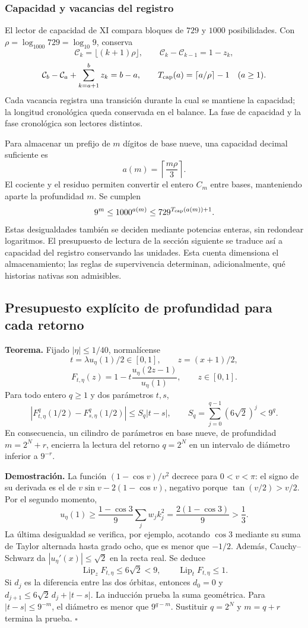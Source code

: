 \subsubsection{Capacidad y vacancias del registro}

El lector de capacidad de XI compara bloques de \(729\) y \(1000\) posibilidades. Con \(\rho=\log_{1000}729=\log_{10}9\), conserva
\[
\mathcal C_k=\lfloor(k+1)\rho\rfloor,\qquad
\mathcal C_k-\mathcal C_{k-1}=1-z_k,
\]
\[
\mathcal C_b-\mathcal C_a+\sum_{k=a+1}^b z_k=b-a,
\qquad T_{\rm cap}(a)=\lceil a/\rho\rceil-1\quad(a\ge1).
\]
Cada vacancia registra una transición durante la cual se mantiene la capacidad; la longitud cronológica queda conservada en el balance. La fase de capacidad y la fase cronológica son lectores distintos.

Para almacenar un prefijo de \(m\) dígitos de base nueve, una capacidad decimal suficiente es
\[
a(m)=\left\lceil\frac{m\rho}{3}\right\rceil.
\]
El cociente y el residuo permiten convertir el entero \(C_m\) entre bases, manteniendo aparte la profundidad \(m\). Se cumplen
\[
9^m\le1000^{a(m)}\le729^{T_{\rm cap}(a(m))+1}.
\]
Estas desigualdades también se deciden mediante potencias enteras, sin redondear logaritmos. El presupuesto de lectura de la sección siguiente se traduce así a capacidad del registro conservando las unidades. Esta cuenta dimensiona el almacenamiento; las reglas de supervivencia determinan, adicionalmente, qué historias nativas son admisibles.


\subsection{Presupuesto explícito de profundidad para cada retorno}
\label{hmtfg:prolongacion:3}

\textbf{Teorema.} Fijado \(|\eta|\le1/40\), normalícense
\[
t=\lambda u_\eta(1)/2\in[0,1],\qquad z=(x+1)/2,
\]
\[
F_{t,\eta}(z)=1-t\frac{u_\eta(2z-1)}{u_\eta(1)},\qquad z\in[0,1].
\]
Para todo entero \(q\ge1\) y dos parámetros \(t,s\),
\[
\left|F_{t,\eta}^{q}(1/2)-F_{s,\eta}^{q}(1/2)\right|
\le S_q|t-s|,
\qquad S_q=\sum_{j=0}^{q-1}(6\sqrt2)^j<9^q.
\]
En consecuencia, un cilindro de parámetros en base nueve, de profundidad \(m=2^N+r\), encierra la lectura del retorno \(q=2^N\) en un intervalo de diámetro inferior a \(9^{-r}\).

\textbf{Demostración.} La función \((1-\cos v)/v^2\) decrece para \(0<v<\pi\): el signo de su derivada es el de \(v\sin v-2(1-\cos v)\), negativo porque \(\tan(v/2)>v/2\). Por el segundo momento,
\[
u_\eta(1)\ge\frac{1-\cos3}{9}\sum_jw_jk_j^2
=\frac{2(1-\cos3)}9>\frac13.
\]
La última desigualdad se verifica, por ejemplo, acotando \(\cos3\) mediante su suma de Taylor alternada hasta grado ocho, que es menor que \(-1/2\). Además, Cauchy–Schwarz da \(|u_\eta'(x)|\le\sqrt2\) en la recta real. Se deduce
\[
\operatorname{Lip}_zF_{t,\eta}\le6\sqrt2<9,\qquad
\operatorname{Lip}_tF_{t,\eta}\le1.
\]
Si \(d_j\) es la diferencia entre las dos órbitas, entonces \(d_0=0\) y \(d_{j+1}\le6\sqrt2\,d_j+|t-s|\). La inducción prueba la suma geométrica. Para \(|t-s|\le9^{-m}\), el diámetro es menor que \(9^{q-m}\). Sustituir \(q=2^N\) y \(m=q+r\) termina la prueba. \(\square\)

